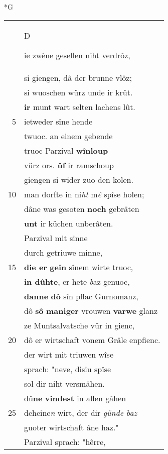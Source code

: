 \documentclass[8pt,a4paper,notitlepage]{article}
\begin{document}
\begin{table}[ht]
\begin{minipage}[t]{0.5\linewidth}
\small
\begin{center}*G
\end{center}
\begin{tabular}{rl}
 & \begin{large}D\end{large}ie zwêne gesellen niht verdrôz,\\ 
 & si giengen, dâ der brunne vlôz;\\ 
 & si wuoschen würz unde ir krût.\\ 
 & \textbf{ir} munt wart selten lachens lût.\\ 
5 & ietweder sîne hende\\ 
 & twuoc. an einem gebende\\ 
 & truoc Parzival \textbf{wînloup}\\ 
 & vürz ors. \textbf{ûf} ir ramschoup\\ 
 & giengen si wider zuo den kolen.\\ 
10 & man dorfte in ni\textit{ht} m\textit{ê} spîse holen;\\ 
 & dâne was gesoten \textbf{noch} gebrâten\\ 
 & \textbf{unt} ir küchen unberâten.\\ 
 & Parzival mit sinne\\ 
 & durch getriuwe minne,\\ 
15 & \textbf{die er} \textbf{gein} sînem wirte truoc,\\ 
 & \textbf{in dûhte}, er hete \textit{b}az genuoc,\\ 
 & \textbf{danne} \textbf{dô} sîn pflac Gurnomanz,\\ 
 & dô \textbf{sô} \textbf{maniger} vrouwen \textbf{varwe} glanz\\ 
 & ze Muntsalvatsche vür in gienc,\\ 
20 & dô er wirtschaft vonem Grâle enpfienc.\\ 
 & der wirt mit triuwen wîse\\ 
 & sprach: "neve, disiu spîse\\ 
 & sol dir niht versmâhen.\\ 
 & dû\textbf{ne} \textbf{vindest} in allen gâhen\\ 
25 & deheine\textit{n} wirt, der dir \textit{günde baz}\\ 
 & guoter wirtschaft âne haz."\\ 
 & Parzival sprach: "hêrre,\\ 

\end{tabular}
\end{minipage}
\end{table}
\end{document}
